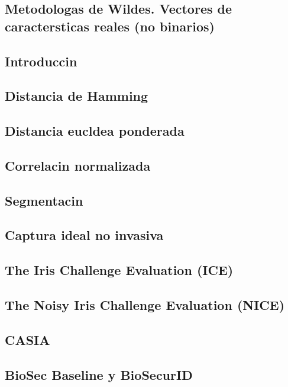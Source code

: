 \subsection{Metodologas de Wildes. Vectores de caractersticas reales (no binarios)}


\label{sec:matching}
\subsection{Introduccin}
\subsection{Distancia de Hamming} 
\label{subsec:distHamming}
\subsection{Distancia eucldea ponderada}
\subsection{Correlacin normalizada}


\label{sec:problematica}
\subsection{Segmentacin}
\subsection{Captura ideal no invasiva}


\label{sec:competiciones}
\subsection{The Iris Challenge Evaluation (ICE)}
\subsection{The Noisy Iris Challenge Evaluation (NICE)}


 \label{sec:databases}
\subsection{CASIA} \label{sec:CASIA_database}
\subsection{BioSec Baseline y BioSecurID} \label{sec:ATVS_database}



\newpage \thispagestyle{empty} %